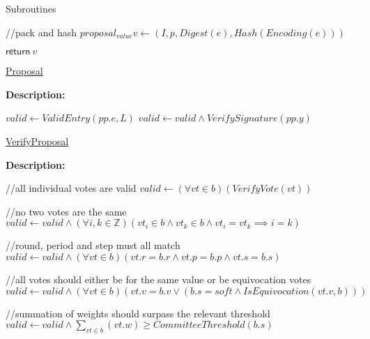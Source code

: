 \documentclass[10pt,a4paper]{article}
\begin{document}
\begin{section}{Subroutines}
\begin{algorithm}[H]
\begin{algorithmic}[1]
    //pack and hash
    \State $proposal_{value} v \gets (I, p, Digest(e), Hash(Encoding(e)))$

    \State $\mathsf{return} \ v$

    \EndFunction
    \end{algorithmic}
    \caption{\underline{Proposal}}
\end{algorithm}

\noindent \textbf{Description:}\\ 


\begin{algorithm}[H]
    \begin{algorithmic}[1]

    \State $valid \gets ValidEntry(pp.e, L)$
    \State $valid \gets valid \land VerifySignature(pp.y)$

    \EndFunction
    \end{algorithmic}
    \caption{\underline{VerifyProposal}}
\end{algorithm}

\noindent \textbf{Description:}\\


\begin{algorithm}[H]
    \begin{algorithmic}[1]

    //all individual votes are valid
    \State $valid \gets (\forall vt \in b)(VerifyVote(vt))$
    
    //no two votes are the same
    \State $valid \gets valid \land (\forall i,k \in \mathbb{Z})(vt_i \in b \land vt_k \in b \land vt_i = vt_k \implies i=k)$

    //round, period and step must all match
    \State $valid \gets valid \land (\forall vt \in b)(vt.r = b.r \land vt.p = b.p \land vt.s = b.s)$
  
    //all votes should either be for the same value or be equivocation votes
    \State $valid \gets valid \land (\forall vt \in b)(vt.v = b.v \lor (b.s = soft \land IsEquivocation(vt.v, b)))$

    //summation of weights should surpass the relevant threshold
    \State $valid \gets valid \land  \sum_{vt \in b}(vt.w) \geq CommitteeThreshold(b.s)$


\end{algorithmic}
\end{algorithm}
\end{section}
\end{document}
